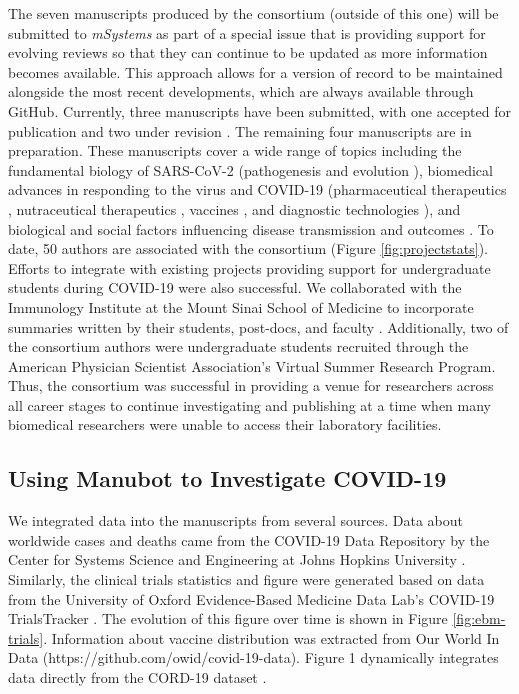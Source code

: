 \documentclass[sigconf]{acmart}
\begin{document}
The seven manuscripts produced by the consortium (outside of this one) will be submitted to \emph{mSystems} as part of a special issue that is providing support for evolving reviews so that they can continue to be updated as more information becomes available.
This approach allows for a version of record to be maintained alongside the most recent developments, which are always available through GitHub.
Currently, three manuscripts have been submitted, with one accepted for publication \citep{1B22G6dja} and two under revision \citep{r366f5T3, cifK9B8t}.
The remaining four manuscripts are in preparation.
These manuscripts cover a wide range of topics including the fundamental biology of SARS-CoV-2 (pathogenesis \citep{r366f5T3} and evolution \citep{17qiILENK}), biomedical advances in responding to the virus and COVID-19 (pharmaceutical therapeutics \citep{cifK9B8t}, nutraceutical therapeutics \citep{1B22G6dja}, vaccines \citep{i2CGFwI3}, and diagnostic technologies \citep{m8bOfc0M}), and biological and social factors influencing disease transmission and outcomes \citep{Up1vB19z}.
To date, 50 authors are associated with the consortium (Figure \ref{fig:projectstats}).
Efforts to integrate with existing projects providing support for undergraduate students during COVID-19 were also successful.
We collaborated with the Immunology Institute at the Mount Sinai School of Medicine to incorporate summaries written by their students, post-docs, and faculty \citep{cYo4O2qX, YZ4cHNuH}.
Additionally, two of the consortium authors were undergraduate students recruited through the American Physician Scientist Association's Virtual Summer Research Program.
Thus, the consortium was successful in providing a venue for researchers across all career stages to continue investigating and publishing at a time when many biomedical researchers were unable to access their laboratory facilities.

\hypertarget{using-manubot-to-investigate-covid-19}{%
\subsection{Using Manubot to Investigate COVID-19}\label{using-manubot-to-investigate-covid-19}}

We integrated data into the manuscripts from several sources.
Data about worldwide cases and deaths came from the COVID-19 Data Repository by the Center for Systems Science and Engineering at Johns Hopkins University \citep{MrwDDw9R}.
Similarly, the clinical trials statistics and figure were generated based on data from the University of Oxford Evidence-Based Medicine Data Lab's COVID-19 TrialsTracker \citep{SSbnPnzT}.
The evolution of this figure over time is shown in Figure \ref{fig:ebm-trials}.
Information about vaccine distribution was extracted from Our World In Data (https://github.com/owid/covid-19-data).
Figure 1 dynamically integrates data directly from the CORD-19 dataset \citep{CiOwklc6}.
\end{document}
